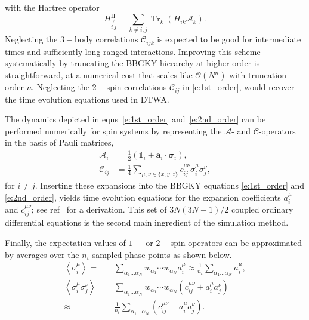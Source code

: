 \documentclass[extendedabs]{bmvc2k}
\DeclareMathOperator{\Tr}{{Tr}}
\begin{document}
with the Hartree operator
\begin{equation}
 H_{i\not{\,j}}^\text{H}=\sum_{k\neq i,j}\Tr_k\left(H_{ik} \mathscr{A}_k\right).
\end{equation}
Neglecting the $3-$body correlations $\mathscr{C}_{ijk}$ is expected to be good for intermediate times and sufficiently long-ranged interactions. Improving this scheme systematically by truncating the BBGKY hierarchy at higher order is straightforward, at a numerical cost that scales like $\mathscr{O}\left(N^n\right)$ with truncation order $n$. Neglecting the $2-$spin correlations $\mathscr{C}_{ij}$ in \eqref{e:1st_order}, would recover the time evolution equations used in DTWA.

The dynamics depicted in eqns~\ref*{e:1st_order} and~\ref*{e:2nd_order} can be performed numerically for spin systems by representing the $\mathscr{A}$- and $\mathscr{C}$-operators in the basis of Pauli matrices,
\begin{subequations}
\begin{align}
\mathscr{A}_i &= \tfrac{1}{2}\left(\mathbb{1}_i+\bm{a}_i\cdot\bm{\sigma}_i\right),\label{e:Aexp}\\
\mathscr{C}_{ij} &= \tfrac{1}{4}\sum_{\mu,\nu\in\{x,y,z\}}c_{ij}^{\mu\nu}\sigma_i^\mu\sigma_j^\nu,\label{e:Cexp}
\end{align}
\end{subequations}
for $i\neq j$. Inserting these expansions into the BBGKY equations \eqref{e:1st_order} and \eqref{e:2nd_order}, yields
time evolution equations for the expansion coefficients $a_i^\mu$ and $c_{ij}^{\mu\nu}$; see ref~\cite{Pucci16} for a derivation. This set of $3N(3N-1)/2$ coupled ordinary differential equations is the second main ingredient of the simulation method.

Finally, the expectation values of $1-$ or $2-$spin operators can be approximated by averages over the $n_t$ sampled phase points as shown below.
\begin{subequations}
\begin{align}
\left\langle\sigma_i^\mu\right\rangle =& \sum_{\alpha_1\dots\alpha_N}w_{\alpha_1}\cdots w_{\alpha_N} a_i^\mu \approx \frac{1}{n_t}\sum_{\alpha_1\dots\alpha_N} a_i^\mu,\label{e:1spin}\\
\left\langle\sigma_i^\mu\sigma_j^\nu\right\rangle =& \sum_{\alpha_1\dots\alpha_N}w_{\alpha_1}\cdots w_{\alpha_N} \left(c_{ij}^{\mu\nu}+a_i^\mu a_j^\nu\right)\nonumber\\
\approx& \frac{1}{n_t}\sum_{\alpha_1\dots\alpha_N} \left(c_{ij}^{\mu\nu}+a_i^\mu a_j^\nu\right).\label{e:2spin}
\end{align}
\end{subequations}
\end{document}
